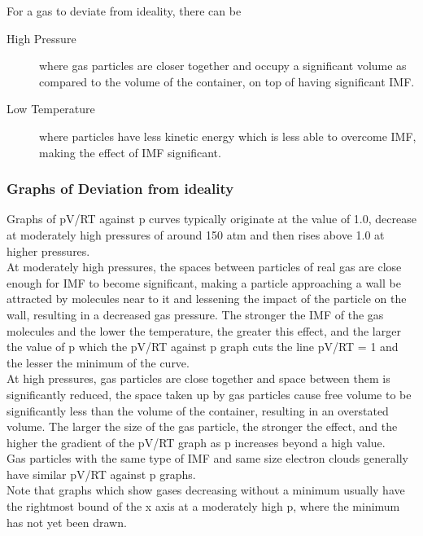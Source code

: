 \documentclass[../main]{subfiles}
\begin{document}
	For a gas to deviate from ideality, there can be 

	\begin{description}
		\item[High Pressure] where gas particles are closer together and occupy a significant volume as compared to the volume of the container, on top of having significant IMF.
		\item[Low Temperature] where particles have less kinetic energy which is less able to overcome IMF, making the effect of IMF significant.
	\end{description}

	\subsubsection{Graphs of Deviation from ideality}

	Graphs of pV/RT against p curves typically originate at the value of 1.0, decrease at moderately high pressures of around 150 atm and then rises above 1.0 at higher pressures. \\

	At moderately high pressures, the spaces between particles of real gas are close enough for IMF to become significant, making a particle approaching a wall be attracted by molecules near to it and lessening the impact of the particle on the wall, resulting in a decreased gas pressure. The stronger the IMF of the gas molecules and the lower the temperature, the greater this effect, and the larger the value of p which the pV/RT against p graph cuts the line pV/RT = 1 and the lesser the minimum of the curve. \\

	At high pressures, gas particles are close together and space between them is significantly reduced, the space taken up by gas particles cause free volume to be significantly less than the volume of the container, resulting in an overstated volume. The larger the size of the gas particle, the stronger the effect, and the higher the gradient of the pV/RT graph as p increases beyond a high value. \\

	Gas particles with the same type of IMF and same size electron clouds generally have similar pV/RT against p graphs. \\

	Note that graphs which show gases decreasing without a minimum usually have the rightmost bound of the x axis at a moderately high p, where the minimum has not yet been drawn. \\
\end{document}
